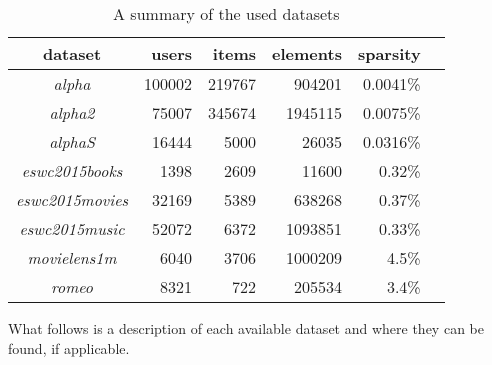 \begin{table}[h]
    \centering
    \begin{tabular}{| c | r | r | r | r | l |}
        \hline
        \textbf{dataset}        & \textbf{users}    & \textbf{items}    & \textbf{elements} & \textbf{sparsity}  \\ \hline

        \textit{alpha}          &   100002          & 219767            & 904201            & 0.0041\%           \\ \hline
        \textit{alpha2}         &   75007           & 345674            & 1945115           & 0.0075\%           \\ \hline
        \textit{alphaS}         &   16444           & 5000              & 26035             & 0.0316\%           \\ \hline
        \textit{eswc2015books}  &   1398            & 2609              & 11600             & 0.32\%             \\ \hline
        \textit{eswc2015movies} &   32169           & 5389              & 638268            & 0.37\%             \\ \hline
        \textit{eswc2015music}  &   52072           & 6372              & 1093851           & 0.33\%             \\ \hline
        \textit{movielens1m}    &   6040            & 3706              & 1000209           & 4.5\%              \\ \hline
        \textit{romeo}          &   8321            & 722               & 205534            & 3.4\%              \\ \hline

    \end{tabular}
    \caption{A summary of the used datasets}
    \label{tab:datasets}
\end{table}

\FloatBarrier

What follows is a description of each available dataset and where they can be found, if applicable.

